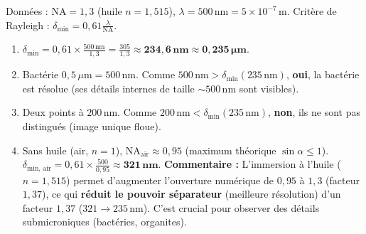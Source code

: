 \documentclass[11pt]{article}
\begin{document}
\begin{corrige}
Données : $\text{NA} = 1,3$ (huile $n=1,515$), $\lambda = 500\,\text{nm} = 5\times10^{-7}\,\text{m}$.
Critère de Rayleigh : $\delta_{\text{min}} = 0,61 \frac{\lambda}{\text{NA}}$.

\begin{enumerate}
    \item $\delta_{\text{min}} = 0,61 \times \frac{500\,\text{nm}}{1,3} = \frac{305}{1,3} \approx \mathbf{234,6\,\text{nm}} \approx \mathbf{0,235\,\mu\text{m}}$.
    \item Bactérie $0,5\,\mu\text{m} = 500\,\text{nm}$. Comme $500\,\text{nm} > \delta_{\text{min}} (235\,\text{nm})$, \textbf{oui}, la bactérie est résolue (ses détails internes de taille $\sim 500\,\text{nm}$ sont visibles).
    \item Deux points à $200\,\text{nm}$. Comme $200\,\text{nm} < \delta_{\text{min}} (235\,\text{nm})$, \textbf{non}, ils ne sont pas distingués (image unique floue).
    \item Sans huile (air, $n=1$), $\text{NA}_{\text{air}} \approx 0,95$ (maximum théorique $\sin\alpha \le 1$).
    $\delta_{\text{min, air}} = 0,61 \times \frac{500}{0,95} \approx \mathbf{321\,\text{nm}}$.
    \textbf{Commentaire :} L'immersion à l'huile ($n=1,515$) permet d'augmenter l'ouverture numérique de $0,95$ à $1,3$ (facteur $1,37$), ce qui \textbf{réduit le pouvoir séparateur} (meilleure résolution) d'un facteur $1,37$ ($321 \to 235\,\text{nm}$). C'est crucial pour observer des détails submicroniques (bactéries, organites).
\end{enumerate}
\end{corrige}
\end{document}
